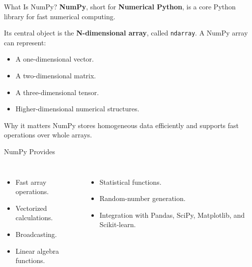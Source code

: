 \documentclass[aspectratio=169,11pt]{beamer}
\newcommand{\key}[1]{\textbf{\textcolor{AccentGreen}{#1}}}
\newcommand{\imageplaceholder}[2]{%
\begin{center}
  \fcolorbox{SoftGray}{gray!5}{%
  \begin{minipage}[c][0.55\textheight][c]{0.84\linewidth}
  \centering
  {\Large\textcolor{TitleBlue}{Image Placeholder}}\\\[1.0em]
  {\normalsize\textbf{#2}}\\\[1.2em]
  {\footnotesize Source path in Markdown:}\\\[0.35em]
  {\small\texttt{\detokenize{#1}}}
  \end{minipage}}
\end{center}
}
\begin{document}
\begin{frame}{What Is NumPy?}
\small
\key{NumPy}, short for \key{Numerical Python}, is a core Python library for fast numerical computing.
\vspace{0.4em}

Its central object is the \key{N-dimensional array}, called \texttt{ndarray}. A NumPy array can represent:
\begin{itemize}
  \item A one-dimensional vector.
  \item A two-dimensional matrix.
  \item A three-dimensional tensor.
  \item Higher-dimensional numerical structures.
\end{itemize}
\begin{block}{Why it matters}
NumPy stores homogeneous data efficiently and supports fast operations over whole arrays.
\end{block}
\end{frame}

\begin{frame}{NumPy Provides}
\small
\begin{columns}[T]
\begin{itemize}
  \item Fast array operations.
  \item Vectorized calculations.
  \item Broadcasting.
  \item Linear algebra functions.
\end{itemize}
\begin{itemize}
  \item Statistical functions.
  \item Random-number generation.
  \item Integration with Pandas, SciPy, Matplotlib, and Scikit-learn.
\end{itemize}
\end{columns}
\vspace{0.7em}
\end{frame}
\end{document}
